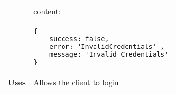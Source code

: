 \begin{adjustwidth}{1cm}{}
\begin{longtable}{|c|l|}
            &                         content: \\
            & \begin{minipage}[t]{0.7\textwidth}
                \begin{adjustwidth}{1.5cm}{}
                \begin{verbatim}
{
    success: false, 
    error: 'InvalidCredentials' ,
    message: 'Invalid Credentials'
}
                \end{verbatim}
                \end{adjustwidth}
              \end{minipage} \\
              \hline
            \textbf{Uses} & Allows the client to login \\
            \hline
        \end{longtable}
    \end{adjustwidth}
    
